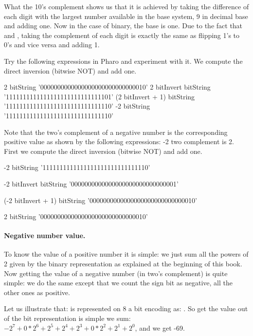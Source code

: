 \documentclass[a4paper,10pt,twoside]{book}
\begin{document}
What the 10's complement shows us  that it is achieved by taking the difference of each digit with the largest number available in the base system, 9 in decimal base and adding one. Now in the case of binary, the base is one.
Due to the fact that  and , taking the complement of each digit is exactly the same as flipping 1's to 0's and vice versa and adding 1.


Try the following expressions in Pharo and experiment with it. We compute the direct inversion (bitwise NOT) and add one. 
\begin{code}{}
2 bitString 
			'0000000000000000000000000000010'
2 bitInvert bitString 
			'1111111111111111111111111111101'
(2 bitInvert + 1) bitString 
			'1111111111111111111111111111110'
-2 bitString 
			'1111111111111111111111111111110'		 
\end{code}

Note that the two's complement of a negative number is the corresponding positive value as shown by the following expressions: -2 two complement is 2. First we compute the direct inversion (bitwise NOT) and add one. 

\begin{code}{}
-2 bitString 
	'1111111111111111111111111111110'
	
-2 bitInvert bitString  
	'0000000000000000000000000000001'
	
(-2 bitInvert + 1) bitString   
	'0000000000000000000000000000010'

2 bitString 
	'0000000000000000000000000000010'
\end{code}

\paragraph{Negative number value.}
To know the value of a positive number it is simple: we just sum all the powers of 2 given by the binary representation as explained at the beginning of this book. Now getting the value of a negative number (in two's complement) is quite simple: we do the same except that we count the sign bit as negative, all the other ones as positive. 

Let us illustrate that: 
 is represented on 8 a bit encoding as: . So get the value out of the bit representation is simple we sum: $-2^7 + 0*2^6 + 2^5 + 2^4 + 2^3 + 0*2^2 + 2^1 + 2^0$, \ie {} and we get -69. 
\end{document}
